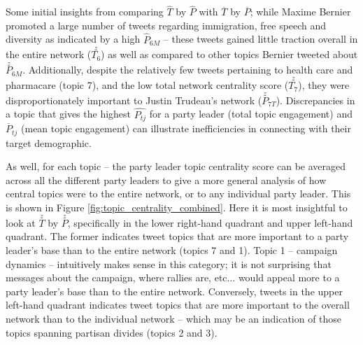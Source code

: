 Some initial insights from comparing \textbf{$\hat{T}$} by \textbf{$\hat{P}$}
with \textbf{$\overline{T}$} by \textbf{$\overline{P}$}; while Maxime Bernier
promoted a large number of tweets regarding immigration, free speech and
diversity as indicated by a high $\hat{P}_{6M}$ -- these tweets gained little
traction overall in the entire network ($\stackrel{z}{T_{6}}$) as well as
compared to other topics Bernier tweeted about $\stackrel{z}{P}_{6M}$.
Additionally, despite the relatively few tweets pertaining to health care and
pharmacare (topic 7), and the low total network centrality score
($\stackrel{z}{T_{7}}$), they were disproportionately important to Justin
Trudeau's network ($\stackrel{z}{P}_{7T}$). Discrepancies in a topic that gives
the highest $\hat{P_{tj}}$ for a party leader (total topic engagement) and
$\overline{P}_{tj}$  (mean topic engagement) can illustrate inefficiencies in
connecting with their target demographic.

As well, for each topic -- the party leader topic centrality score can be
averaged across all the different party leaders to give a more general analysis
of how central topics were to the entire network, or to any individual party
leader. This is shown in Figure \ref{fig:topic_centrality_combined}. Here it is
most insightful to look at \textbf{$\stackrel{z}{T}$} by
\textbf{$\stackrel{z}{P}$}, specifically in the lower right-hand quadrant and
upper left-hand quadrant. The former indicates tweet topics that are more
important to a party leader's base than to the entire network (topics 7 and 1).
Topic 1 -- campaign dynamics -- intuitively makes sense in this category; it is
not surprising that messages about the campaign, where rallies are, etc... would
appeal more to a party leader's base than to the entire network. Conversely,
tweets in the upper left-hand quadrant indicates tweet topics that are more
important to the overall network than to the individual network -- which may be
an indication of those topics spanning partisan divides (topics 2 and 3).

